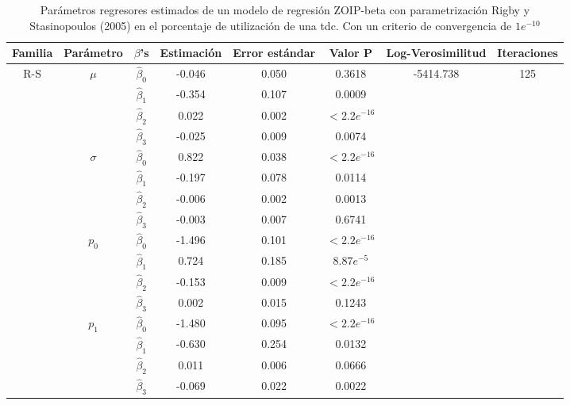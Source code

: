 \begin{table}[!hbt]
{\scriptsize
\begin{center}
\begin{tabular}{|c|c|c|ccc|c|c|}\hline
Familia & Par\'{a}metro & $\beta$'s & Estimaci\'{o}n & Error est\'{a}ndar & Valor P & Log-Verosimilitud & Iteraciones \\ \hline \hline
\multirow{12}{*}{R-S} & \multirow{4}{*}{$\mu$} & $\hat{\beta}_0$ & -0.046	&0.050	&0.3618 & \multirow{12}{*}{-5414.738} & \multirow{12}{*}{125}  \\
& & $\hat{\beta}_1$ & -0.354	&0.107	&0.0009 & &\\
& & $\hat{\beta}_2$ & 0.022	&0.002	&$<2.2e^{-16}$ & & \\
& & $\hat{\beta}_3$ & -0.025	&0.009	&0.0074 & & \\ \cline{2-6}
& \multirow{4}{*}{$\sigma$} & $\hat{\beta}_0$ & 0.822	&0.038	&$<2.2e^{-16}$  & &\\
& & $\hat{\beta}_1$ & -0.197	&0.078	&0.0114  & &\\
& & $\hat{\beta}_2$ & -0.006	&0.002	&0.0013  & &\\
& & $\hat{\beta}_3$ & -0.003	&0.007	&0.6741  & &\\ \cline{2-6}
& \multirow{4}{*}{$p_0$} & $\hat{\beta}_0$ & -1.496	&0.101	&$<2.2e^{-16}$  & &\\
& & $\hat{\beta}_1$ & 0.724	&0.185	&$8.87e^{-5}$  & &\\
& & $\hat{\beta}_2$ & -0.153	&0.009	&$<2.2e^{-16}$  & &\\
& & $\hat{\beta}_3$ & 0.002	&0.015	&0.1243  & &\\ \cline{2-6}
& \multirow{4}{*}{$p_1$} & $\hat{\beta}_0$ &-1.480	&0.095	&$<2.2e^{-16}$  & &\\
& & $\hat{\beta}_1$ & -0.630	&0.254	&0.0132  & &\\
& & $\hat{\beta}_2$ & 0.011	&0.006	&0.0666  & &\\
& & $\hat{\beta}_3$ & -0.069	&0.022	&0.0022  & &\\ \hline

\end{tabular}
\caption{Par\'{a}metros regresores estimados de un modelo de regresi\'{o}n ZOIP-beta con parametrizaci\'{o}n Rigby y Stasinopoulos (2005) en el porcentaje de utilizaci\'{o}n de una tdc. Con un criterio de convergencia de $1e^{-10}$}
\label{T_Apli_CC_RS}
\end{center}
}
\end{table}


